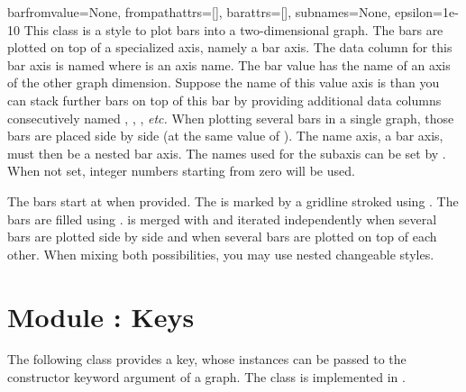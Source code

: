 \begin{classdesc}{bar}{fromvalue=None, frompathattrs=[], barattrs=[],
                       subnames=None, epsilon=1e-10}
  This class is a style to plot bars into a two-dimensional graph. The
  bars are plotted on top of a specialized axis, namely a bar axis.
  The data column for this bar axis is named  where
   is an axis name. The bar value has the name of an axis of the
  other graph dimension. Suppose the name of this value axis is
   than you can stack further bars on top of this bar by
  providing additional data columns consecutively named
  , , , \emph{etc.}
  When plotting several bars in a single graph, those bars are placed
  side by side (at the same value of ). The name axis, a
  bar axis, must then be a nested bar axis. The names used for the
  subaxis can be set by . When not set, integer numbers
  starting from zero will be used.

  The bars start at  when provided. The 
  is marked by a gridline stroked using . The bars
  are filled using .  is merged with
   and
  iterated independently when several bars are plotted side by side
  and when several bars are plotted on top of each other. When mixing
  both possibilities, you may use nested changeable styles.
\end{classdesc}

\section{Module : Keys}
\label{graph:key}


The following class provides a key, whose instances can be passed to
the constructor keyword argument  of a graph. The class is
implemented in .

